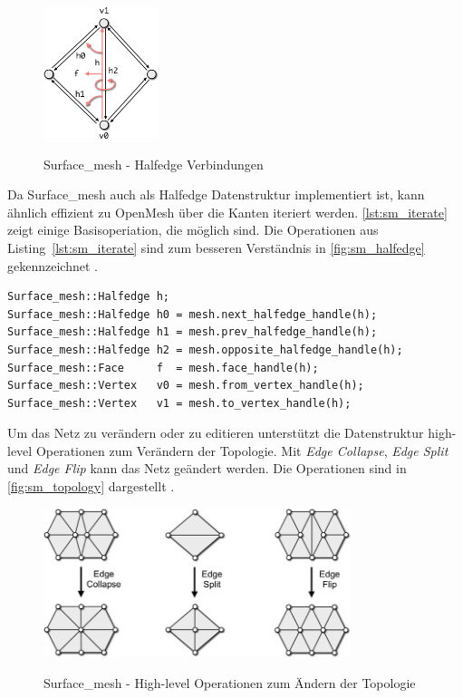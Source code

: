 \begin{figure}
  \caption{Surface\_mesh - Halfedge Verbindungen}
  \centering
  \includegraphics[width=0.3\textwidth]{content/media/sm_connectivity-queries}
  \label{fig:sm_halfedge}
\end{figure}

Da Surface\_mesh auch als Halfedge Datenstruktur implementiert ist, kann ähnlich effizient zu OpenMesh über die Kanten iteriert werden.
\autoref{lst:sm_iterate} zeigt einige Basisoperiation, die möglich sind.
Die Operationen aus Listing~\ref{lst:sm_iterate} sind zum besseren Verständnis in \autoref{fig:sm_halfedge} gekennzeichnet \cite{OpenGP.24.07.2015}. 

\begin{lstlisting}[style=myCppStyle, caption=Surface\_mesh - Basisoperationen, label=lst:sm_iterate]
Surface_mesh::Halfedge h;
Surface_mesh::Halfedge h0 = mesh.next_halfedge_handle(h);
Surface_mesh::Halfedge h1 = mesh.prev_halfedge_handle(h);
Surface_mesh::Halfedge h2 = mesh.opposite_halfedge_handle(h);
Surface_mesh::Face     f  = mesh.face_handle(h);
Surface_mesh::Vertex   v0 = mesh.from_vertex_handle(h);
Surface_mesh::Vertex   v1 = mesh.to_vertex_handle(h);
\end{lstlisting}

Um das Netz zu verändern oder zu editieren unterstützt die Datenstruktur high-level Operationen zum Verändern der Topologie.
Mit \emph{Edge Collapse}, \emph{Edge Split} und \emph{Edge Flip} kann das Netz geändert werden.
Die Operationen sind in \autoref{fig:sm_topology} dargestellt \cite{OpenGP.24.07.2015}. 

\begin{figure}
  \caption{Surface\_mesh - High-level Operationen zum Ändern der Topologie}
  \centering
  \includegraphics[width=0.8\textwidth]{content/media/sm_topology-changes}
  \label{fig:sm_topology}
\end{figure}

